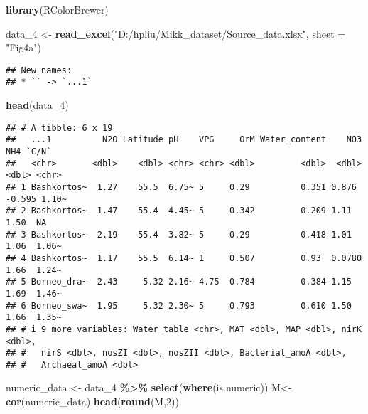\documentclass[
]{article}
\newenvironment{Shaded}{\begin{snugshade}}{\end{snugshade}}
\newcommand{\AttributeTok}[1]{\textcolor[rgb]{0.13,0.29,0.53}{#1}}
\newcommand{\DecValTok}[1]{\textcolor[rgb]{0.00,0.00,0.81}{#1}}
\newcommand{\FunctionTok}[1]{\textcolor[rgb]{0.13,0.29,0.53}{\textbf{#1}}}
\newcommand{\NormalTok}[1]{#1}
\newcommand{\OtherTok}[1]{\textcolor[rgb]{0.56,0.35,0.01}{#1}}
\newcommand{\SpecialCharTok}[1]{\textcolor[rgb]{0.81,0.36,0.00}{\textbf{#1}}}
\newcommand{\StringTok}[1]{\textcolor[rgb]{0.31,0.60,0.02}{#1}}
\begin{document}
\begin{Shaded}
\begin{Highlighting}[]
\FunctionTok{library}\NormalTok{(RColorBrewer)}

\NormalTok{data\_4 }\OtherTok{\textless{}{-}} \FunctionTok{read\_excel}\NormalTok{(}\StringTok{"D:/hpliu/Mikk\_dataset/Source\_data.xlsx"}\NormalTok{, }\AttributeTok{sheet =} \StringTok{"Fig4a"}\NormalTok{)}
\end{Highlighting}
\end{Shaded}

\begin{verbatim}
## New names:
## * `` -> `...1`
\end{verbatim}

\begin{Shaded}
\begin{Highlighting}[]
\FunctionTok{head}\NormalTok{(data\_4)}
\end{Highlighting}
\end{Shaded}

\begin{verbatim}
## # A tibble: 6 x 19
##   ...1          N2O Latitude pH    VPG     OrM Water_content    NO3    NH4 `C/N`
##   <chr>       <dbl>    <dbl> <chr> <chr> <dbl>         <dbl>  <dbl>  <dbl> <chr>
## 1 Bashkortos~  1.27    55.5  6.75~ 5     0.29          0.351 0.876  -0.595 1.10~
## 2 Bashkortos~  1.47    55.4  4.45~ 5     0.342         0.209 1.11    1.50  NA   
## 3 Bashkortos~  2.19    55.4  3.82~ 5     0.29          0.418 1.01    1.06  1.06~
## 4 Bashkortos~  1.17    55.5  6.14~ 1     0.507         0.93  0.0780  1.66  1.24~
## 5 Borneo_dra~  2.43     5.32 2.16~ 4.75  0.784         0.384 1.15    1.69  1.46~
## 6 Borneo_swa~  1.95     5.32 2.30~ 5     0.793         0.610 1.50    1.66  1.35~
## # i 9 more variables: Water_table <chr>, MAT <dbl>, MAP <dbl>, nirK <dbl>,
## #   nirS <dbl>, nosZI <dbl>, nosZII <dbl>, Bacterial_amoA <dbl>,
## #   Archaeal_amoA <dbl>
\end{verbatim}

\begin{Shaded}
\begin{Highlighting}[]
\NormalTok{numeric\_data }\OtherTok{\textless{}{-}}\NormalTok{ data\_4 }\SpecialCharTok{\%\textgreater{}\%} \FunctionTok{select}\NormalTok{(}\FunctionTok{where}\NormalTok{(is.numeric))}
\NormalTok{M}\OtherTok{\textless{}{-}}\FunctionTok{cor}\NormalTok{(numeric\_data)}
\FunctionTok{head}\NormalTok{(}\FunctionTok{round}\NormalTok{(M,}\DecValTok{2}\NormalTok{))}
\end{Highlighting}
\end{Shaded}
\end{document}
